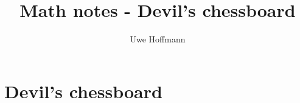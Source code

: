 

\title{Math notes - Devil's chessboard}
\author{Uwe Hoffmann}



\setcounter{chapter}{0}
\chapter{Devil's chessboard}
